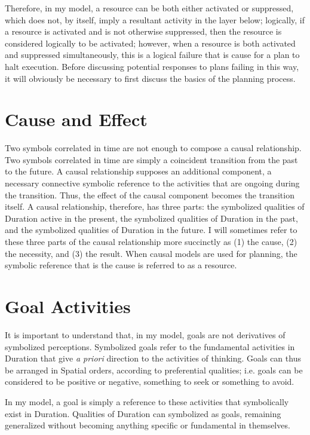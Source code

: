 Therefore, in my model, a resource can be both either activated or
suppressed, which does not, by itself, imply a resultant activity in
the layer below; logically, if a resource is activated and is not
otherwise suppressed, then the resource is considered logically to be
activated; however, when a resource is both activated and suppressed
simultaneously, this is a logical failure that is cause for a plan to
halt execution.  Before discussing potential responses to plans
failing in this way, it will obviously be necessary to first discuss
the basics of the planning process.

\section{Cause and Effect}

Two symbols correlated in time are not enough to compose a causal
relationship.  Two symbols correlated in time are simply a coincident
transition from the past to the future.  A causal relationship
supposes an additional component, a necessary connective symbolic
reference to the activities that are ongoing during the transition.
Thus, the effect of the causal component becomes the transition
itself.  A causal relationship, therefore, has three parts: the
symbolized qualities of Duration active in the present, the symbolized
qualities of Duration in the past, and the symbolized qualities of
Duration in the future.  I will sometimes refer to these three parts
of the causal relationship more succinctly as (1) the cause, (2) the
necessity, and (3) the result.  When causal models are used for
planning, the symbolic reference that is the cause is referred to as a
resource.

\section{Goal Activities}

It is important to understand that, in my model, goals are not
derivatives of symbolized perceptions.  Symbolized goals refer to the
fundamental activities in Duration that give \emph{a priori} direction
to the activities of thinking.  Goals can thus be arranged in Spatial
orders, according to preferential qualities; i.e. goals can be
considered to be positive or negative, something to seek or something
to avoid.

In my model, a goal is simply a reference to these activities that
symbolically exist in Duration.  Qualities of Duration can symbolized
as goals, remaining generalized without becoming anything specific or
fundamental in themselves.

